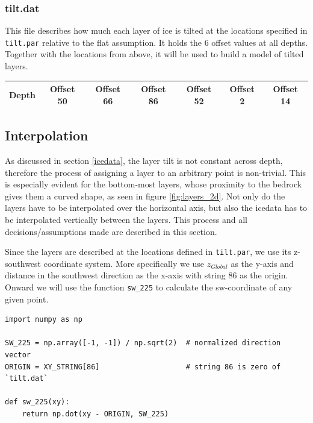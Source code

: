 \documentclass[a4paper,10pt]{scrartcl}
\begin{document}
\subsubsection*{tilt.dat}

This file describes how much each layer of ice is tilted at the locations specified in \texttt{tilt.par} relative to the flat assumption.
It holds the 6 offset values at all depths.
Together with the locations from above, it will be used to build a model of tilted layers.

\begin{center}
    \begin{tabular}{ |c||c|c|c|c|c|c| }
        \hline
        Depth & Offset 50 & Offset 66 & Offset 86 & Offset 52 & Offset 2 & Offset 14 \\
        \hline
    \end{tabular}
\end{center}

\subsection{Interpolation}
\label{interpolation}

As discussed in section \ref{icedata}, the layer tilt is not constant across depth, therefore the process of assigning a layer to an arbitrary point is non-trivial.
This is especially evident for the bottom-most layers, whose proximity to the bedrock gives them a curved shape, as seen in figure \ref{fig:layers_2d}.
Not only do the layers have to be interpolated over the horizontal axis, but also the icedata has to be interpolated vertically between the layers.
This process and all decisions/assumptions made are described in this section.

Since the layers are described at the locations defined in \texttt{tilt.par}, we use its z-southwest coordinate system.
More specifically we use $z_{Global}$ as the y-axis and distance in the southwest direction as the x-axis with string 86 as the origin.
Onward we will use the function \texttt{sw\_225} to calculate the sw-coordinate of any given point.

\begin{verbatim}
import numpy as np

SW_225 = np.array([-1, -1]) / np.sqrt(2)  # normalized direction vector
ORIGIN = XY_STRING[86]                    # string 86 is zero of `tilt.dat`

def sw_225(xy):
    return np.dot(xy - ORIGIN, SW_225)
\end{verbatim}
\end{document}
